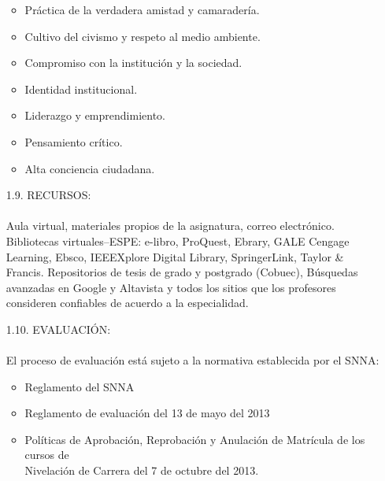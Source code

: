 \documentclass[10pt,a4paper]{article}
\begin{document}
\begin{enumerate}
\begin{itemize}
\item	Práctica de la verdadera amistad y camaradería.
\item	Cultivo del civismo y respeto al medio ambiente.
\item	Compromiso con la institución y la sociedad.
\item	Identidad institucional.
\item	Liderazgo y emprendimiento.
\item	Pensamiento crítico.
\item	Alta conciencia ciudadana. \\
\end{itemize}
\item[1.9.]	RECURSOS:\\\\
Aula virtual, materiales propios de la asignatura, correo electrónico. Bibliotecas virtuales–ESPE: e-libro, ProQuest, Ebrary, GALE Cengage Learning, Ebsco, IEEEXplore Digital Library, SpringerLink, Taylor \& Francis. Repositorios de tesis de grado y postgrado (Cobuec), Búsquedas avanzadas en Google y Altavista y todos los sitios que los profesores consideren confiables de acuerdo a la especialidad.
\item[1.10.]	EVALUACIÓN:\\\\
El proceso de evaluación está sujeto a la normativa establecida por el SNNA:
\begin{itemize}
\item Reglamento del SNNA
\item	Reglamento de evaluación del 13 de mayo del 2013
\item	Políticas de Aprobación, Reprobación y Anulación de Matrícula de los cursos de\\ Nivelación de Carrera del 7 de octubre del 2013.\\
\end{itemize}


\end{enumerate}
\end{document}

